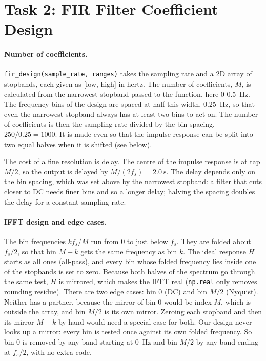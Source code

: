 \documentclass[11pt,a4paper]{article}
\newcommand{\rng}[2]{#1\,\textendash\,#2}
\newcommand{\fix}[1]{#1}
\begin{document}
\section*{Task 2: FIR Filter Coefficient Design}

\paragraph{Number of coefficients.}
\texttt{fir\_design(sample\_rate, ranges)} takes the sampling rate and a 2D array of stopbands, each given as [low, high] in hertz.
The number of coefficients, $M$, is calculated from the narrowest stopband passed to the function, here \rng{0}{\SI{0.5}{\hertz}}.
The frequency bins of the design are spaced at half this width, \SI{0.25}{\hertz}, so that even the narrowest stopband always has at least two bins to act on.
The number of coefficients is then the sampling rate divided by the bin spacing, $250/0.25 = 1000$.
It is made even so that the impulse response can be split into two equal halves when it is shifted (see below).

The cost of a fine resolution is delay.
The centre of the impulse response is at tap $M/2$, so the output is delayed by $M/(2f_s) = \SI{2.0}{\second}$.
The delay depends only on the bin spacing, which was set above by the narrowest stopband: a filter that cuts closer to DC needs finer bins and so a longer delay; halving the spacing doubles the delay for a constant sampling rate.

\paragraph{IFFT design and edge cases.}
The bin frequencies $k f_s/M$ run from 0 to just below $f_s$.
They are folded about $f_s/2$, so that bin $M-k$ gets the same frequency as bin $k$.
The ideal response $H$ starts as all ones (all-pass), and every bin whose folded frequency lies inside one of the stopbands is set to zero.
Because both halves of the spectrum go through the same test, $H$ is mirrored, which makes the IFFT real (\texttt{np.real} only removes rounding residue).
\fix{There are two edge cases: bin 0 (DC) and bin $M/2$ (Nyquist).
Neither has a partner, because the mirror of bin 0 would be index $M$, which is outside the array, and bin $M/2$ is its own mirror.
Zeroing each stopband and then its mirror $M-k$ by hand would need a special case for both.
Our design never looks up a mirror: every bin is tested once against its own folded frequency.
So bin 0 is removed by any band starting at \SI{0}{\hertz} and bin $M/2$ by any band ending at $f_s/2$, with no extra code.}
\end{document}
